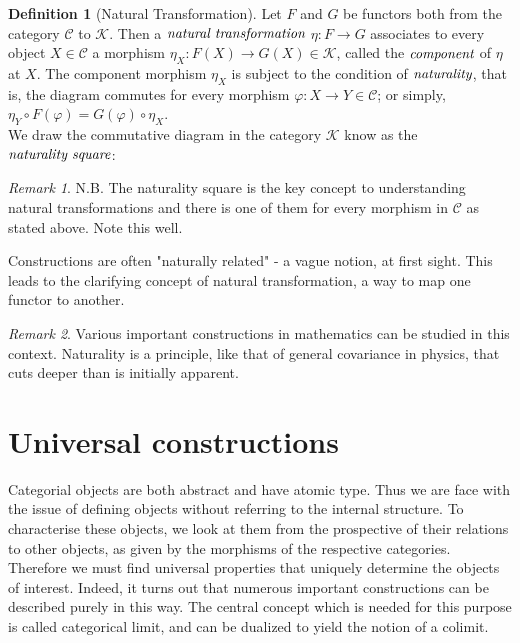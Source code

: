 \documentclass[10pt, oneside, reqno]{amsart}
\theoremstyle{plain}%
\theoremstyle{definition}
\newtheorem{defn}[thm]{Definition}
\theoremstyle{remark}
\newtheorem*{rem}{Remark}
\begin{document}
\begin{defn}[Natural Transformation]
 Let $F$ and $G$ be functors both from the category $\mathcal{C}$ to $\mathcal{K}$.
 Then a $\emph{natural transformation}$ $\eta : F \to G$ associates to every object
 $X \in \mathcal{C}$ a morphism $\eta_{X} : F(X) \to G(X) \in \mathcal{K}$, called the $\emph{component}$
 of $\eta$ at $X$. The component morphism $\eta_{X}$ is subject to the condition of $\emph{naturality}$,
 that is, the diagram commutes for every morphism $\varphi: X \to Y \in \mathcal{C}$; or simply,
 $\eta_{Y} \circ F(\varphi) = G(\varphi) \circ \eta_{X}$.
 \\
 We draw the commutative diagram in the category $\mathcal{K}$ know as the $\emph{naturality square}$:
\end{defn}
\begin{rem}
 N.B. The naturality square is the key concept to understanding natural transformations and
 there is one of them for every morphism in $\mathcal{C}$ as stated above. Note this well.
\end{rem}

Constructions are often "naturally related" - a vague notion, at first sight.
This leads to the clarifying concept of natural transformation, a way to map one functor to another.
\begin{rem}
 Various important constructions in mathematics can be studied in this context.
 Naturality is a principle, like that of general covariance in physics, that cuts deeper than is initially apparent.
\end{rem}


\section{Universal constructions} %
\label{sec:universalconstructions}
Categorial objects are both abstract and have atomic type.
Thus we are face with the issue of defining objects without referring to the internal structure.
To characterise these objects, we look at them from the prospective of their relations to other objects, as given by the morphisms 
of the respective categories. Therefore we must find universal properties that uniquely determine the objects of interest.
Indeed, it turns out that numerous important constructions can be described purely in this way.
The central concept which is needed for this purpose is called categorical limit, and can be dualized to yield the notion of a colimit.
\end{document}
